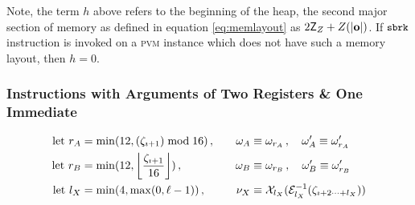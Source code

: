 Note, the term $h$ above refers to the beginning of the heap, the second major section of memory as defined in equation \ref{eq:memlayout} as $2\mathsf{Z}_Z + \rnq{\len{\mathbf{o}}}$. If $\text{{\small \texttt{sbrk}}}$ instruction is invoked on a \textsc{pvm} instance which does not have such a memory layout, then $h = 0$.

\subsubsection{Instructions with Arguments of Two Registers \& One Immediate}
\begin{equation}
\begin{aligned}
  \using r_A &= \min(12, (\instructions_{\imath+1}) \bmod 16) \,,\quad&
  \reg_A &\equiv \reg_{r_A} \,,\quad
  \reg'_A \equiv \reg'_{r_A} \\
  \using r_B &= \min(12, \ffrac{\instructions_{\imath+1}}{16}) \,,\quad&
  \reg_B &\equiv \reg_{r_B} \,,\quad
  \reg'_B \equiv \reg'_{r_B} \\
  \using l_X &= \min(4, \max(0, \ell - 1)) \,,\quad&
  \immed_X &\equiv \sext_{l_X}(\fixeddecode{l_X}{\instructions\subrange{\imath+2}{l_X}})
\end{aligned}
\end{equation}

